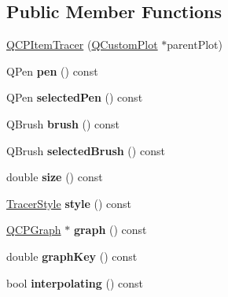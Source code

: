 \subsection*{Public Member Functions}
\begin{DoxyCompactItemize}
\item 
\hyperlink{classQCPItemTracer_adc5ca846eeac323db4aa1fc4081e36be}{Q\+C\+P\+Item\+Tracer} (\hyperlink{classQCustomPlot}{Q\+Custom\+Plot} $\ast$parent\+Plot)
\item 
\mbox{\label{classQCPItemTracer_a789cdc627868f5a4a0956816072571c9}} 
Q\+Pen {\bfseries pen} () const
\item 
\mbox{\label{classQCPItemTracer_ad231a97bac99e01778618d1a5720b17d}} 
Q\+Pen {\bfseries selected\+Pen} () const
\item 
\mbox{\label{classQCPItemTracer_a6dd4660e70f58bb00390bcda56be568d}} 
Q\+Brush {\bfseries brush} () const
\item 
\mbox{\label{classQCPItemTracer_ae3e48270b4a6ec20f7a9e1f63e778243}} 
Q\+Brush {\bfseries selected\+Brush} () const
\item 
\mbox{\label{classQCPItemTracer_a4e42d7b49f293273a74a49a2457856e2}} 
double {\bfseries size} () const
\item 
\mbox{\label{classQCPItemTracer_afdaee32c9ccc9c14502b28d3d86bf5ed}} 
\hyperlink{classQCPItemTracer_a2f05ddb13978036f902ca3ab47076500}{Tracer\+Style} {\bfseries style} () const
\item 
\mbox{\label{classQCPItemTracer_ac6526e3e1fff79894f034823461b138a}} 
\hyperlink{classQCPGraph}{Q\+C\+P\+Graph} $\ast$ {\bfseries graph} () const
\item 
\mbox{\label{classQCPItemTracer_ac39a0791109588d11bb97cd643da2470}} 
double {\bfseries graph\+Key} () const
\item 
\mbox{\label{classQCPItemTracer_ae9ab6d72e0a35e1769c0b5a9b58181f2}} 
bool {\bfseries interpolating} () const
\item 

\end{DoxyCompactItemize}
